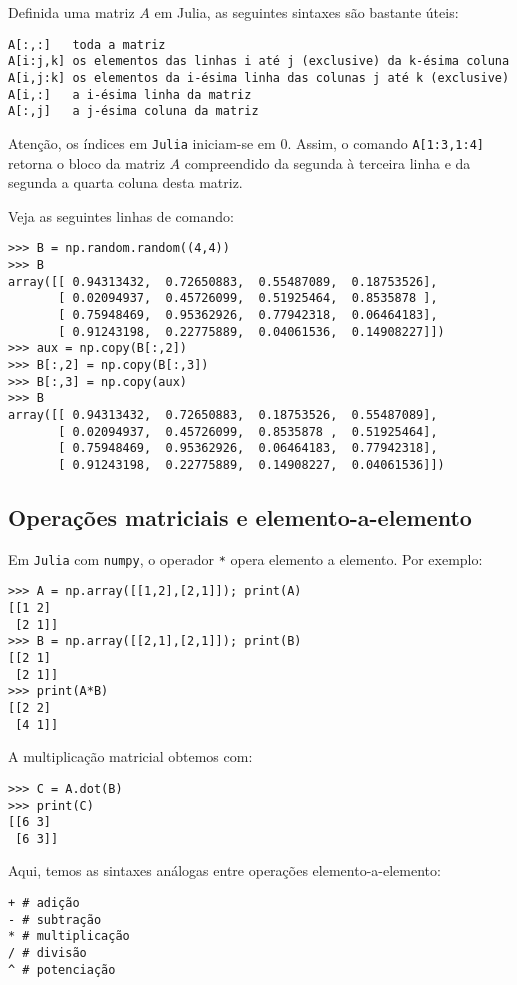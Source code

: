 Definida uma matriz $A$ em Julia, as seguintes sintaxes são bastante úteis:
\begin{lstlisting}
A[:,:]   toda a matriz
A[i:j,k] os elementos das linhas i até j (exclusive) da k-ésima coluna
A[i,j:k] os elementos da i-ésima linha das colunas j até k (exclusive)
A[i,:]   a i-ésima linha da matriz
A[:,j]   a j-ésima coluna da matriz
\end{lstlisting}

Atenção, os índices em \verb+Julia+ iniciam-se em $0$. Assim, o comando \verb+A[1:3,1:4]+ retorna o bloco da matriz $A$ compreendido da segunda à terceira linha e da segunda a quarta coluna desta matriz.

\begin{ex}
Veja as seguintes linhas de comando:
\begin{lstlisting}
>>> B = np.random.random((4,4))
>>> B
array([[ 0.94313432,  0.72650883,  0.55487089,  0.18753526],
       [ 0.02094937,  0.45726099,  0.51925464,  0.8535878 ],
       [ 0.75948469,  0.95362926,  0.77942318,  0.06464183],
       [ 0.91243198,  0.22775889,  0.04061536,  0.14908227]])
>>> aux = np.copy(B[:,2])
>>> B[:,2] = np.copy(B[:,3])
>>> B[:,3] = np.copy(aux)
>>> B
array([[ 0.94313432,  0.72650883,  0.18753526,  0.55487089],
       [ 0.02094937,  0.45726099,  0.8535878 ,  0.51925464],
       [ 0.75948469,  0.95362926,  0.06464183,  0.77942318],
       [ 0.91243198,  0.22775889,  0.14908227,  0.04061536]])
\end{lstlisting}
\end{ex}

\subsection{Operações matriciais e elemento-a-elemento}

Em \verb+Julia+ com \verb+numpy+, o operador \verb+*+ opera elemento a elemento. Por exemplo:
\begin{lstlisting}
>>> A = np.array([[1,2],[2,1]]); print(A)
[[1 2]
 [2 1]]
>>> B = np.array([[2,1],[2,1]]); print(B)
[[2 1]
 [2 1]]
>>> print(A*B)
[[2 2]
 [4 1]]
\end{lstlisting}
A multiplicação matricial obtemos com:
\begin{lstlisting}
>>> C = A.dot(B)
>>> print(C)
[[6 3]
 [6 3]]
\end{lstlisting}

Aqui, temos as sintaxes análogas entre operações elemento-a-elemento:
\begin{lstlisting}
+ # adição
- # subtração
* # multiplicação
/ # divisão
^ # potenciação
\end{lstlisting}

